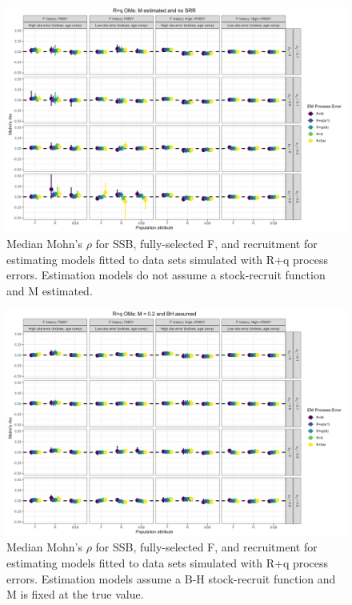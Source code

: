\documentclass[
  12pt,
]{article}
\begin{document}
\begin{landscape}
\begin{figure}
\caption{Median Mohn's $\rho$ for SSB, fully-selected F, and recruitment for estimating models fitted to data sets simulated with R+q process errors.  Estimation models do not assume a stock-recruit function and M estimated.}\label{q_om_em_R_ME_mohns_rho}
\begin{center}
\includegraphics[width = \textwidth]{q_om_mohns_rho_R_ME.png}
\end{center}
\end{figure}
\end{landscape}

\begin{landscape}
\begin{figure}
\caption{Median Mohn's $\rho$ for SSB, fully-selected F, and recruitment for estimating models fitted to data sets simulated with R+q process errors.  Estimation models assume a B-H stock-recruit function and M is fixed at the true value.}\label{q_om_em_BH_MF_mohns_rho}
\begin{center}
\includegraphics[width = \textwidth]{q_om_mohns_rho_BH_MF.png}
\end{center}
\end{figure}
\end{landscape}
\end{document}
